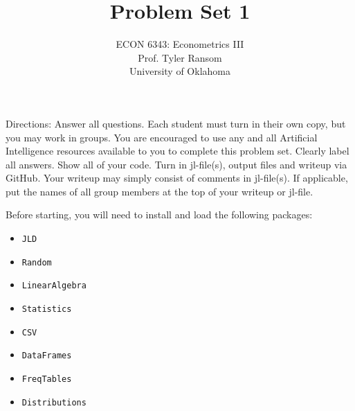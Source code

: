 \documentclass[12pt,english]{article}
\begin{document}
\title{Problem Set 1}
\author{ECON 6343: Econometrics III\\
Prof. Tyler Ransom\\
University of Oklahoma}
\date{}%

\maketitle
Directions: Answer all questions. Each student must turn in their own copy, but you may work in groups. You are encouraged to use any and all Artificial Intelligence resources available to you to complete this problem set. Clearly label all answers. Show all of your code. Turn in jl-file(s), output files and writeup via GitHub. Your writeup may simply consist of comments in jl-file(s). If applicable, put the names of all group members at the top of your writeup or jl-file.


Before starting, you will need to install and load the following packages:
\begin{itemize}
    \item[~] \texttt{JLD}
    \item[~] \texttt{Random}
    \item[~] \texttt{LinearAlgebra}
    \item[~] \texttt{Statistics}
    \item[~] \texttt{CSV} 
    \item[~] \texttt{DataFrames} 
    \item[~] \texttt{FreqTables} 
    \item[~] \texttt{Distributions} 
\end{itemize}
\end{document}
